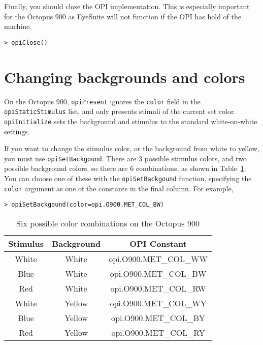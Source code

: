 \documentclass{article}
\begin{document}
Finally, you should close the OPI implementation. This is especially important for the Octopus
900 as EyeSuite will not function if the OPI has hold of the machine.

\begin{verbatim}
> opiClose()
\end{verbatim}



\section{Changing backgrounds and colors}

On the Octopus 900, {\tt opiPresent} ignores the {\tt color} field in the {\tt
opiStaticStimulus} list, and only presents stimuli of the current
set color.
{\tt opiInitialize} sets the background and
stimulus to the standard white-on-white settings.

If you want to change the stimulus color, or the background from
white to yellow, you must use {\tt opiSetBackgound}. There are 3
possible stimulus colors, and two possible background colors, so
there are 6 combinations, as shown in Table~\ref{tab-met-col}.
You can choose one of these with the {\tt opiSetBackgound} function, specifying the {\tt color}
argument as one of the constants in the final column.
For example,
\begin{verbatim}
> opiSetBackgound(color=opi.O900.MET_COL_BW)
\end{verbatim}

\begin{table}
\centering
\begin{tabular}{ccc}
\hline
Stimulus & Background & OPI Constant \\
\hline
White    & White & opi.O900.MET\_COL\_WW \\
Blue     & White & opi.O900.MET\_COL\_BW \\
Red      & White & opi.O900.MET\_COL\_RW \\
White    & Yellow & opi.O900.MET\_COL\_WY \\
Blue     & Yellow & opi.O900.MET\_COL\_BY \\
Red      & Yellow & opi.O900.MET\_COL\_RY \\
\hline
\end{tabular}
\caption{\label{tab-met-col}Six possible color combinations on the Octopus 900}
\end{table}
\end{document}
